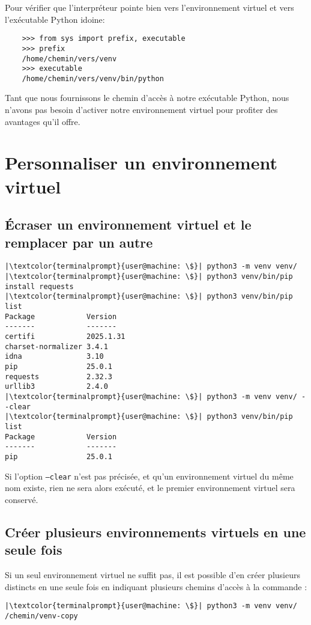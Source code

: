 Pour vérifier que l'interpréteur pointe bien vers l'environnement virtuel  et vers l'exécutable Python idoine:
\begin{verbatim}
    >>> from sys import prefix, executable
    >>> prefix
    /home/chemin/vers/venv
    >>> executable
    /home/chemin/vers/venv/bin/python
\end{verbatim}

Tant que nous fournissons le chemin d'accès à notre exécutable Python, nous n'avons pas besoin d'activer notre environnement virtuel pour profiter des avantages qu'il offre.

\section{Personnaliser un environnement virtuel}
\subsection*{Écraser un environnement virtuel et le remplacer par un autre}
\begin{lstlisting}[style=terminal]
|\textcolor{terminalprompt}{user@machine: \$}| python3 -m venv venv/
|\textcolor{terminalprompt}{user@machine: \$}| python3 venv/bin/pip install requests
|\textcolor{terminalprompt}{user@machine: \$}| python3 venv/bin/pip list
Package            Version
-------            -------
certifi            2025.1.31
charset-normalizer 3.4.1
idna               3.10
pip                25.0.1
requests           2.32.3
urllib3            2.4.0
|\textcolor{terminalprompt}{user@machine: \$}| python3 -m venv venv/ --clear
|\textcolor{terminalprompt}{user@machine: \$}| python3 venv/bin/pip list
Package            Version
-------            -------
pip                25.0.1
\end{lstlisting}

Si l'option \texttt{--clear} n'est pas précisée, et qu'un environnement virtuel du même nom existe, rien ne sera alors exécuté, et le premier environnement virtuel sera conservé.

\subsection*{Créer plusieurs environnements virtuels en une seule fois}
Si un seul environnement virtuel ne suffit pas, il est possible d'en créer plusieurs distincts en une seule fois en indiquant plusieurs chemins d'accès à la commande :
\begin{lstlisting}[style=terminal]
|\textcolor{terminalprompt}{user@machine: \$}| python3 -m venv venv/ /chemin/venv-copy
\end{lstlisting}

